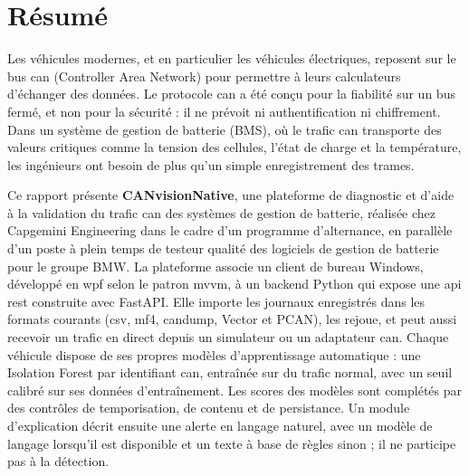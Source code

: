 \chapter*{Résumé}

Les véhicules modernes, et en particulier les véhicules électriques, reposent sur le bus \gls{can} (Controller Area Network) pour permettre à leurs calculateurs d'échanger des données. Le protocole \gls{can} a été conçu pour la fiabilité sur un bus fermé, et non pour la sécurité : il ne prévoit ni authentification ni chiffrement. Dans un système de gestion de batterie (BMS), où le trafic \gls{can} transporte des valeurs critiques comme la tension des cellules, l'état de charge et la température, les ingénieurs ont besoin de plus qu'un simple enregistrement des trames.

Ce rapport présente \textbf{CANvisionNative}, une plateforme de diagnostic et d'aide à la validation du trafic \gls{can} des systèmes de gestion de batterie, réalisée chez Capgemini Engineering dans le cadre d'un programme d'alternance, en parallèle d'un poste à plein temps de testeur qualité des logiciels de gestion de batterie pour le groupe BMW. La plateforme associe un client de bureau Windows, développé en \gls{wpf} selon le patron \gls{mvvm}, à un backend Python qui expose une \gls{api} \gls{rest} construite avec FastAPI. Elle importe les journaux enregistrés dans les formats courants (\gls{csv}, \gls{mf4}, candump, Vector et PCAN), les rejoue, et peut aussi recevoir un trafic en direct depuis un simulateur ou un adaptateur \gls{can}. Chaque véhicule dispose de ses propres modèles d'apprentissage automatique : une Isolation Forest par identifiant \gls{can}, entraînée sur du trafic normal, avec un seuil calibré sur ses données d'entraînement. Les scores des modèles sont complétés par des contrôles de temporisation, de contenu et de persistance. Un module d'explication décrit ensuite une alerte en langage naturel, avec un modèle de langage lorsqu'il est disponible et un texte à base de règles sinon ; il ne participe pas à la détection.


